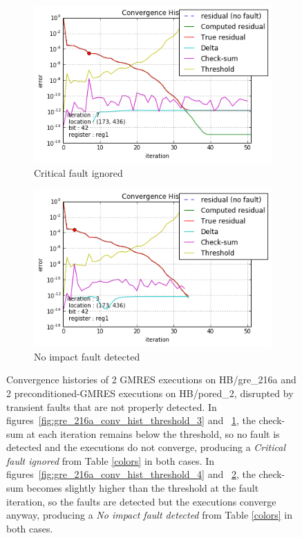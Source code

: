 \begin{figure}[h]
\begin{minipage}[b]{0.48\linewidth}
	\begin{subfigure}[t]{\linewidth}
		\centering
		\includegraphics[width=\linewidth]{figures/pores_2/convergence_history_threshold_3.png}
		\caption{Critical fault ignored}\label{fig:pores_2_conv_hist_threshold_3}
	\end{subfigure}
    \quad
    \begin{subfigure}[t]{\linewidth}
		\centering
		\includegraphics[width=\linewidth]{figures/pores_2/convergence_history_threshold_4.png}
		\caption{No impact fault detected}\label{fig:pores_2_conv_hist_threshold_4}
	\end{subfigure}

    
	\end{minipage}
\caption{Convergence histories of 2 GMRES executions on HB/gre_216a and 2 preconditioned-GMRES executions on HB/pored_2, disrupted by transient faults that are not properly detected. In figures~\ref{fig:gre_216a_conv_hist_threshold_3} and ~\ref{fig:pores_2_conv_hist_threshold_3}, the check-sum at each iteration remains below the threshold, so no fault is detected and the executions do not converge, producing a \emph{Critical fault ignored} from Table \ref{colors} in both cases. In figures~\ref{fig:gre_216a_conv_hist_threshold_4} and ~\ref{fig:pores_2_conv_hist_threshold_4}, the check-sum becomes slightly higher than the threshold at the fault iteration, so the faults are detected but the executions converge anyway, producing a \emph{No impact fault detected} from Table \ref{colors} in both cases. }\label{fig:conv_hist_threshold_false}
\end{figure}
